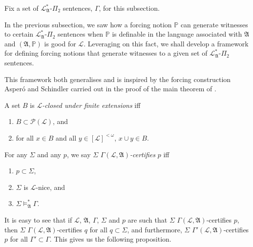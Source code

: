 \documentclass[12pt]{article}
\numberwithin{equation}{section}
\begin{document}
Fix a set of $\mathcal{L}^*_{\mathfrak{A}}$-$\Pi_2$ sentences, $\Gamma$, for this subsection.

In the previous subsection, we saw how a forcing notion $\mathbb{P}$ can generate witnesses to certain $\mathcal{L}^*_{\mathfrak{A}}$-$\Pi_2$ sentences when $\mathbb{P}$ is definable in the language associated with $\mathfrak{A}$ and $(\mathfrak{A}, \mathbb{P})$ is good for $\mathcal{L}$. Leveraging on this fact, we shall develop a framework for defining forcing notions that generate witnesses to a given set of $\mathcal{L}^*_{\mathfrak{A}}$-$\Pi_2$ sentences. 

This framework both generalises and is inspired by the forcing construction Asper\'{o} and Schindler carried out in the proof of the main theorem of \cite{schindler}.

\begin{defi}
A set $B$ is $\mathcal{L}$\emph{-closed under finite extensions} iff
\begin{enumerate}[label=(\alph*)]
    \item $B \subset \mathcal{P}(\mathcal{L})$, and
    \item for all $x \in B$ and all $y \in [\mathcal{L}]^{< \omega}$, $x \cup y \in B$.
\end{enumerate}
\end{defi}

\begin{defi}
For any $\Sigma$ and any $p$, we say $\Sigma$ $\Gamma(\mathcal{L}, \mathfrak{A})$\emph{-certifies} $p$ iff 
\begin{enumerate}[label=(\alph*)]
    \item $p \subset \Sigma$,
    \item $\Sigma$ is $\mathcal{L}$-nice, and
    \item $\Sigma \models^*_{\mathfrak{A}} \Gamma$.
\end{enumerate}
\end{defi}

It is easy to see that if $\mathcal{L}$, $\mathfrak{A}$, $\Gamma$, $\Sigma$ and $p$ are such that $\Sigma$ $\Gamma(\mathcal{L}, \mathfrak{A})$-certifies $p$, then $\Sigma$ $\Gamma(\mathcal{L}, \mathfrak{A})$-certifies $q$ for all $q \subset \Sigma$, and furthermore, $\Sigma$ $\Gamma'(\mathcal{L}, \mathfrak{A})$-certifies $p$ for all $\Gamma' \subset \Gamma$. This gives us the following proposition.
\end{document}
